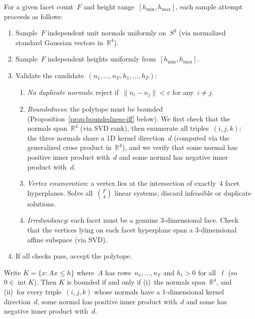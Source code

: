For a given facet count~$F$ and height range~$[h_{\min}, h_{\max}]$, each
sample attempt proceeds as follows:
\begin{enumerate}
  \item Sample~$F$ independent unit normals uniformly on~$S^3$
    (via normalized standard Gaussian vectors in~$\mathbb{R}^4$).
  \item Sample~$F$ independent heights uniformly from~$[h_{\min}, h_{\max}]$.
  \item Validate the candidate~$(n_1, \ldots, n_F, h_1, \ldots, h_F)$:
  \begin{enumerate}
    \item \emph{No duplicate normals}: reject if~$\|n_i - n_j\| < \varepsilon$
      for any~$i \ne j$.
    \item \emph{Boundedness}: the polytope must be bounded
      (Proposition~\ref{prop:boundedness-iff} below). We first check that the
      normals span~$\mathbb{R}^4$ (via SVD rank), then enumerate all
      triples~$(i,j,k)$: the three normals share a 1D kernel direction~$d$
      (computed via the generalized cross product in~$\mathbb{R}^4$), and we
      verify that some normal has positive inner product with~$d$ and some
      normal has negative inner product with~$d$.
    \item \emph{Vertex enumeration}: a vertex lies at the intersection of
      exactly~$4$ facet hyperplanes. Solve all~$\binom{F}{4}$ linear systems,
      discard infeasible or duplicate solutions.
    \item \emph{Irredundancy}: each facet must be a genuine 3-dimensional
      face. Check that the vertices lying on each facet hyperplane span a
      3-dimensional affine subspace (via SVD).
  \end{enumerate}
  \item If all checks pass, accept the polytope.
\end{enumerate}

\begin{proposition}\label{prop:boundedness-iff}
Write $K = \{x : Ax \le h\}$ where~$A$ has rows~$n_1, \ldots, n_F$ and
$h_\ell > 0$ for all~$\ell$ (so $0 \in \operatorname{int} K$). Then $K$ is
bounded if and only if
\textup{(i)}~the normals span~$\mathbb{R}^4$, and
\textup{(ii)}~for every triple~$(i,j,k)$ whose normals have a 1-dimensional
kernel direction~$d$, some normal has positive inner product with~$d$ and some
has negative inner product with~$d$.
\end{proposition}

